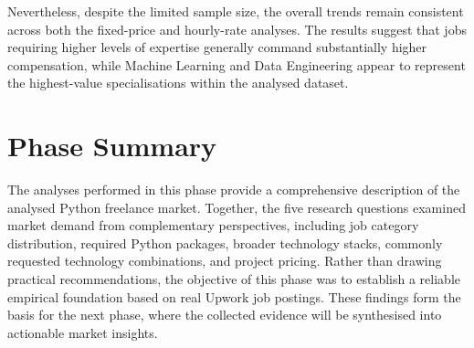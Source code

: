 Nevertheless, despite the limited sample size, the overall trends remain consistent across both the fixed-price and hourly-rate analyses. The results
suggest that jobs requiring higher levels of expertise generally command substantially higher compensation, while Machine Learning and
Data Engineering appear to represent the highest-value specialisations within the analysed dataset.

\section[Phase 2 Summary]{Phase Summary}

The analyses performed in this phase provide a comprehensive description of the analysed Python freelance market. Together, the five
research questions examined market demand from complementary perspectives, including job category distribution, required Python packages,
broader technology stacks, commonly requested technology combinations, and project pricing. Rather than drawing practical recommendations,
the objective of this phase was to establish a reliable empirical foundation based on real Upwork job postings. These findings form the basis for
the next phase, where the collected evidence will be synthesised into actionable market insights.
